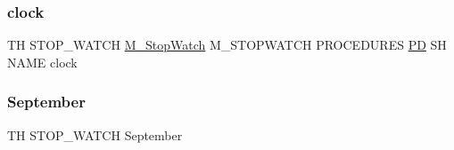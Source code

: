 \subsubsection{\texorpdfstring{clock}{clock}}
{\footnotesize\ttfamily TH S\+T\+O\+P\+\_\+\+W\+A\+T\+CH \hyperlink{option__stopwatch_83_8txt_aa2011fc45a5e502e87ee50996a8a9305}{M\+\_\+\+Stop\+Watch} M\+\_\+\+S\+T\+O\+P\+W\+A\+T\+CH P\+R\+O\+C\+E\+D\+U\+R\+ES \hyperlink{what__overview_81_8txt_a85f26da5a4481fbdb0d9c79f2b94de3e}{PD} SH N\+A\+ME clock}

\mbox{\label{stop__watch_83_8txt_a1d05d9f5f870208fd0790859b520508a}} 
\subsubsection{\texorpdfstring{September}{September}}
{\footnotesize\ttfamily TH S\+T\+O\+P\+\_\+\+W\+A\+T\+CH September}

